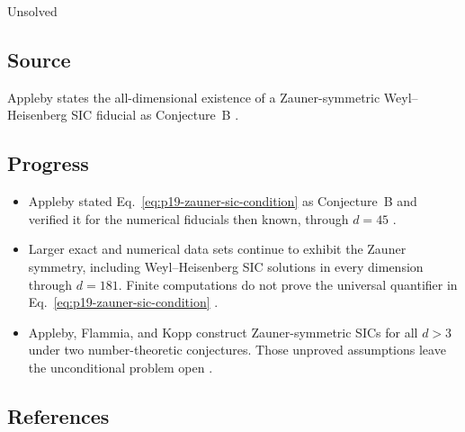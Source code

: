 Unsolved

\subsection*{Source}

Appleby states the all-dimensional existence of a Zauner-symmetric
Weyl--Heisenberg SIC fiducial as Conjecture~B
.

\subsection*{Progress}

\begin{itemize}
  \item Appleby stated Eq.~\eqref{eq:p19-zauner-sic-condition} as
  Conjecture~B and verified it for the numerical fiducials then known, through
  $d=45$ .

  \item Larger exact and numerical data sets continue to exhibit the Zauner
  symmetry, including Weyl--Heisenberg SIC solutions in every dimension
  through $d=181$.  Finite computations do not prove the universal
  quantifier in Eq.~\eqref{eq:p19-zauner-sic-condition}
  .

  \item Appleby, Flammia, and Kopp construct Zauner-symmetric SICs for all
  $d>3$ under two number-theoretic conjectures.  Those unproved assumptions
  leave the unconditional problem open
  .
\end{itemize}

\subsection*{References}

